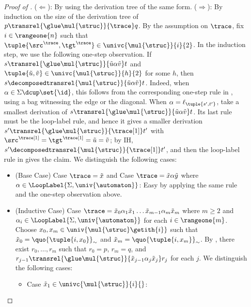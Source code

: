 \begin{proof}[Proof of ]
    ($\Longleftarrow$):
    By using the derivation tree of the same form.
    ($\Longrightarrow$):
    By induction on the size of the derivation tree of $p \transrel{\glue \mul{\struc}}{\trace} q$.
    By the assumption on $\trace$, fix $i \in \rangeone{n}$ such that $\tuple{\src^{\trace}, \tgt^{\trace}} \in \univc{\mul{\struc}}{i}{2}$.
    In the induction step, we use the following one-step observation.
    If $s \transrel{\glue \mul{\struc}}{\tilde{u} \alpha \tilde{v}} t$ and $\tuple{\tilde{u}, \tilde{v}} \in \univc{\mul{\struc}}{h}{2}$ for some $h$,
    then $s \decomposedtransrel{\mul{\struc}}{\tilde{u} \alpha \tilde{v}} t$.
    Indeed, when $\alpha \in \Sigma \dcup \set{\id}$, this follows from the corresponding one-step rule in , using a bag witnessing the edge or the diagonal.
    When $\alpha = \ell_{\tuple{s', t'}}$, take a smallest derivation of $s \transrel{\glue \mul{\struc}}{\tilde{u} \alpha \tilde{v}} t$.
    Its last rule must be the loop-label rule, and hence it gives a smaller derivation
    $s' \transrel{\glue \mul{\struc}}{\trace[1]} t'$ with $\src^{\trace[1]} = \tgt^{\trace[1]} = \tilde{u} = \tilde{v}$;
    by IH, $s' \decomposedtransrel{\mul{\struc}}{\trace[1]} t'$, and then the loop-label rule in  gives the claim.
    We distinguish the following cases:
    \begin{itemize}
        \item (Base Case) Case $\trace = \tilde{x}$ and Case $\trace = \tilde{x} \alpha \tilde{y}$ where $\alpha \in \LoopLabel{\Sigma, \univ{\automaton}}$:
        Easy by applying the same rule and the one-step observation above.
        \item (Inductive Case) Case $\trace = \tilde{x}_0 \alpha_1 \tilde{x}_1 \dots \tilde{x}_{m-1} \alpha_{m} \tilde{x}_{m}$
        where $m \ge 2$ and $\alpha_{i} \in \LoopLabel{\Sigma, \univ{\automaton}}$ for each $i \in \rangeone{m}$.
        Choose $x_0, x_m \in \univ{\mul{\struc}\getith{i}}$ such that
        $\tilde{x}_0 = \quo{\tuple{i, x_0}}_{\sim}$ and $\tilde{x}_m = \quo{\tuple{i, x_m}}_{\sim}$.
        By ,
        there exist $r_0, \dots, r_{m}$ such that
        $r_0 = p$,
        $r_{m} = q$, and
        $r_{j-1} \transrel{\glue \mul{\struc}}{\tilde{x}_{j-1} \alpha_{j} \tilde{x}_{j}} r_{j}$ for each $j$.
        We distinguish the following cases:
        \begin{itemize}
            \item Case $\tilde{x}_1 \in \univc{\mul{\struc}}{i}{}$:

\end{itemize}
\end{itemize}
\end{proof}
